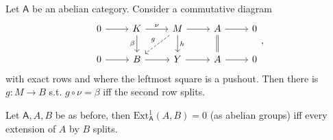 \begin{lem}
	Let $\mathsf{A}$ be an abelian category.
	Consider a commutative diagram
	\begin{equation}
	\begin{tikzcd}
		0 \arrow[r, "", rightarrow] &
		K \arrow[r, "\nu", rightarrow] \arrow[d, "\beta"', rightarrow] &
		M \arrow[r, "", rightarrow] \arrow[d, "h", rightarrow] \arrow[ld, "g"', dashrightarrow] &
		A \arrow[r, "", rightarrow] \arrow[d, "", equal] &
		0\\
		0 \arrow[r, "", rightarrow] &
		B \arrow[r, "", rightarrow] &
		Y \arrow[r, "", rightarrow] &
		A \arrow[r, "", rightarrow] &
		0
	\end{tikzcd}
	,\end{equation} 
	with exact rows and where the leftmost square is a pushout.
	Then there is $g\colon M \to B$ s.t. $g \circ \nu = \beta$
	iff the second row splits.
\end{lem} 

\begin{lem}
	Let $\mathsf{A}, A,B$ be as before,
	then $\mathrm{Ext}^{ 1}_{ \mathsf{A}} \left( A, B \right) = 0$ (as abelian groups)
	iff every extension of $A$ by $B$ splits.
\end{lem} 

